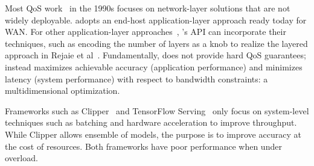 \documentclass[thesis.tex]{subfiles}
\begin{document}
 Most QoS work~\cite{ferrari1990scheme, shenker1994integrated,
  shenker1995fundamental} in the 1990s focuses on network-layer solutions that
are not widely deployable. \sysname{} adopts an end-host application-layer
approach ready today for WAN. For other application-layer
approaches~\cite{vandalore2001survey}, \sysname{}'s API can incorporate their
techniques, such as encoding the number of layers as a knob to realize the
layered approach in Rejaie et al~\cite{rejaie2000layered}. Fundamentally,
\sysname{} does not provide hard QoS guarantees; instead \sysname{} maximizes
achievable accuracy (application performance) and minimizes latency (system
performance) with respect to bandwidth constraints: a multidimensional
optimization.




 Frameworks such as Clipper~\cite{crankshaw2017clipper} and
TensorFlow Serving~\cite{tensorflow2017serving} only focus on system-level
techniques such as batching and hardware acceleration to improve
throughput. While Clipper allows ensemble of models, the purpose is to improve
accuracy at the cost of resources. Both frameworks have poor performance when
under overload.
\end{document}
